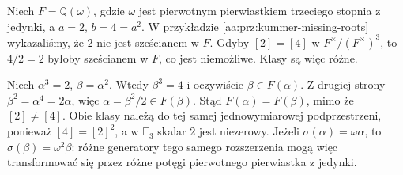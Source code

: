 \begin{przyklad}\label{aa:prz:kummer-class-example}
Niech $F=\mathbb Q(\omega)$, gdzie $\omega$ jest pierwotnym
pierwiastkiem trzeciego stopnia z jedynki,
a $a=2$, $b=4=a^2$. W przykładzie
\ref{aa:prz:kummer-missing-roots} wykazaliśmy,
że $2$ nie jest sześcianem w $F$.
Gdyby $[2]=[4]$ w $F^\times/(F^\times)^3$,
to $4/2=2$ byłoby sześcianem w $F$,
co jest niemożliwe. Klasy są więc różne.

Niech $\alpha^3=2$, $\beta=\alpha^2$.
Wtedy $\beta^3=4$ i oczywiście $\beta\in F(\alpha)$.
Z drugiej strony $\beta^2=\alpha^4=2\alpha$,
więc $\alpha=\beta^2/2\in F(\beta)$.
Stąd $F(\alpha)=F(\beta)$, mimo że $[2]\neq[4]$.
Obie klasy należą do tej samej jednowymiarowej podprzestrzeni,
ponieważ $[4]=[2]^2$, a w $\mathbb F_3$ skalar $2$
jest niezerowy.
Jeżeli $\sigma(\alpha)=\omega\alpha$, to
$\sigma(\beta)=\omega^2\beta$:
różne generatory tego samego rozszerzenia mogą więc
transformować się przez różne potęgi pierwotnego
pierwiastka z jedynki.
\end{przyklad}

